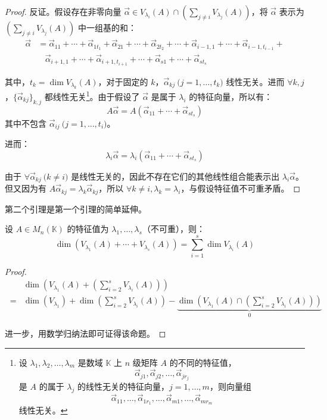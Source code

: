 \begin{proof}
	反证。假设存在非零向量 $\vec \alpha \in V_{\lambda_i}(A) \cap \left( \sum\limits_{j \ne i} V_{\lambda_j}(A) \right)$，将 $\vec \alpha$ 表示为 $\left( \sum\limits_{j \ne i} V_{\lambda_j}(A) \right)$ 中一组基的和：
	$$
	\begin{aligned}
	\vec \alpha &= \vec \alpha_{11} + \cdots + \vec \alpha_{1 t_1} + \vec \alpha_{21} + \cdots + \vec \alpha_{2 t_2} + \cdots + \vec \alpha_{i - 1, 1} + \cdots + \vec \alpha_{i - 1, t_{i - 1}} +
	\\&~~~~
	\vec \alpha_{i + 1, 1} + \cdots + \vec \alpha_{i + 1, t_{i + 1}} + \cdots +\vec \alpha_{s1} + \cdots + \vec \alpha_{st_s}
	\end{aligned}
	$$

	其中，$t_k = \dim V_{\lambda_k}(A)$，对于固定的 $k$，$\vec \alpha_{k j} \pod{j = 1, \ldots, t_k}$ 线性无关。进而 $\forall k, j$，$\{ \vec \alpha_{kj} \}_{k, j}$ 都线性无关\footnote{设 $\lambda_1, \lambda_2, \ldots, \lambda_m$ 是数域 $\mathbb K$ 上 $n$ 级矩阵 $A$ 的不同的特征值，$$\vec \alpha_{j1}, \vec \alpha_{j2}, \ldots, \vec \alpha_{j r_j}$$ 是 $A$ 的属于 $\lambda_j$ 的线性无关的特征向量，$j = 1, \ldots, m$，则向量组 $$\vec \alpha_{11},\ldots, \vec \alpha_{1 r_1}, \ldots, \vec \alpha_{m1}, \ldots, \vec \alpha_{m r_m}$$ 线性无关。}。由于假设了 $\vec \alpha$ 是属于 $\lambda_i$ 的特征向量，所以有：
	$$
	A \vec \alpha = A (\vec \alpha_{11} + \cdots + \vec \alpha_{s t_s})
	$$
	其中不包含 $\vec \alpha_{ij} \pod{j = 1, \ldots, t_i}$。

	进而：
	$$
	\lambda_i \vec \alpha = \lambda_i (\vec \alpha_{11} + \cdots + \vec \alpha_{st_s})
	$$

	由于 $\forall \vec \alpha_{kj} \pod{k \ne i}$ 是线性无关的，因此不存在它们的其他线性组合能表示出 $\lambda_i \vec \alpha$。但又因为有 $A \vec \alpha_{kj} = \lambda_k \vec \alpha_{kj}$，所以 $\forall k \ne i, \lambda_k = \lambda_i$，与假设特征值不可重矛盾。
\end{proof}

第二个引理是第一个引理的简单延伸。

\begin{theorem}
	设 $A \in M_n(\mathbb K)$ 的特征值为 $\lambda_1, \ldots, \lambda_s$（不可重），则：
	$$
	\dim(V_{\lambda_1}(A) + \cdots + V_{\lambda_s}(A)) = \sum\limits_{i = 1}^s \dim V_{\lambda_i}(A)
	$$
\end{theorem}

\begin{proof}
	$$
	\begin{aligned}&
		\dim \left( V_{\lambda_1}(A) + \left( \sum_{i = 2}^s V_{\lambda_i}(A) \right) \right)
		\\~=& \dim(V_{\lambda_1}) + \dim \left( \sum_{i = 2}^s V_{\lambda_i}(A) \right) - \underset{0}{\underbrace{\dim \left( V_{\lambda_1}(A) \cap \left( \sum_{i = 2}^s V_{\lambda_i}(A) \right) \right)}}
	\end{aligned}
	$$

	进一步，用数学归纳法即可证得该命题。
\end{proof}

